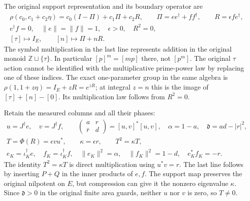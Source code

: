 \documentclass[11pt]{article}
\begin{document}
The original support representation and its boundary operator are
\begin{equation}\tag{TDP11}
\begin{gathered}
\rho(c_0,c_1+c_2\eta)=c_0(I-\Pi)+c_1\Pi+c_2R,\qquad
\Pi=ee^\dagger+ff^\dagger,\qquad R=\epsilon fe^\dagger,\\
e^\dagger f=0,\quad \|e\|=\|f\|=1,\quad \epsilon>0,\quad R^2=0,\\
[\tau]\longmapsto I_E,\qquad [n]\longmapsto\Pi+nR.
\end{gathered}
\end{equation}
The symbol multiplication in the last line represents addition in the
original monoid $\mathbb Z\sqcup\{\tau\}$. In particular $[p]^m=[mp]$
there, not $[p^m]$. The original $\tau$ action cannot be identified with
the multiplicative prime-power law by replacing one of these indices.
The exact one-parameter group in the same algebra is
$\rho(1,1+z\eta)=I_E+zR=e^{zR}$; at integral $z=n$ this is the image
of $[\tau]+[n]-[0]$. Its multiplication law follows from $R^2=0$.

Retain the measured columns and all their phases:
\begin{equation}\tag{TDP12}
\begin{gathered}
u=J^\dagger e,\quad v=J^\dagger f,\qquad
\begin{pmatrix}a&r\\\bar r&d\end{pmatrix}
 =[u,v]^*[u,v],\quad \alpha=1-a,\quad \mathfrak d=ad-|r|^2,\\
T=\Phi(R)=\epsilon vu^*,\qquad \kappa=\epsilon r,\qquad
T^2=\kappa T,\\
e_K=\iota_K^\dagger e,\quad f_K=\iota_K^\dagger f,\quad
\|e_K\|^2=\alpha,\quad\|f_K\|^2=1-d,\quad e_K^*f_K=-r.
\end{gathered}
\end{equation}
The identity $T^2=\kappa T$ is direct multiplication using $u^*v=r$.
The last line follows by inserting $P+Q$ in the inner products of $e,f$.
The support map preserves the original nilpotent on $E$, but compression
can give it the nonzero eigenvalue $\kappa$. Since $\mathfrak d>0$ in
the original finite area guards, neither $u$ nor $v$ is zero, so $T\ne0$.
\end{document}

